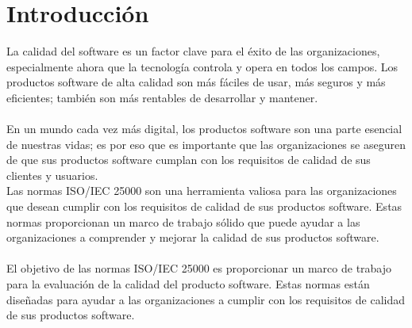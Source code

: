 \documentclass[https://www.overleaf.com/project/63761df255a8a9f4a15c3579
	letterpaper, %
	10pt, %
]{CSUniSchoolLabReport}
\begin{document}
    
    \section{Introducción }
    
        La calidad del software es un factor clave para el éxito de las organizaciones, especialmente ahora que la tecnología controla y opera en todos los campos. Los productos software de alta calidad son más fáciles de usar, más seguros y más eficientes; también son más rentables de desarrollar y mantener.
        \\\\
        En un mundo cada vez más digital, los productos software son una parte esencial de nuestras vidas; es por eso que es importante que las organizaciones se aseguren de que sus productos software cumplan con los requisitos de calidad de sus clientes y usuarios.
        \\
        Las normas ISO/IEC 25000 son una herramienta valiosa para las organizaciones que desean cumplir con los requisitos de calidad de sus productos software. Estas normas proporcionan un marco de trabajo sólido que puede ayudar a las organizaciones a comprender y mejorar la calidad de sus productos software.
        \\\\
        El objetivo de las normas ISO/IEC 25000 es proporcionar un marco de trabajo para la evaluación de la calidad del producto software. Estas normas están diseñadas para ayudar a las organizaciones a cumplir con los requisitos de calidad de sus productos software.
        
    
\end{document}
